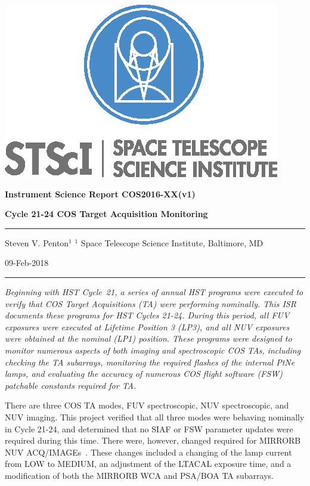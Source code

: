 \documentclass[12pt]{reportj}
\newcommand*{\myfont}{\fontfamily{rm}\selectfont}
\def\acqimages{{\myfont ACQ/IMAGE{\rm s}}\rm~}
\begin{document}
\vspace{-2.4cm}
\noindent\includegraphics*[width=0.295\linewidth]{new_st_logo.eps}

\vspace{-0.4cm}

\begin{flushright}
{\bf Instrument Science Report COS2016-XX(v1)}

\vspace{1.1cm}

{\bf\Huge Cycle 21-24 COS Target Acquisition Monitoring}

\rule{0.25\linewidth}{0.5pt}

\vspace{0.5cm}
Steven V. Penton$^1$
\linebreak
\newline
\footnotesize{$^1$ Space Telescope Science Institute, Baltimore, MD}
\vspace{0.5cm}

09-Feb-2018
\end{flushright}

\vspace{0.1cm}
\noindent\rule{\linewidth}{1.0pt}

{\it \noindent
Beginning with HST Cycle~21, a series of annual HST programs were executed to verify that COS Target Acquisitions (TA) were performing
nominally.  This ISR documents these programs for HST Cycles 21-24. During this period, all FUV exposures were executed at Lifetime Position 3 (LP3),
and all NUV exposures were obtained at the nominal (LP1) position.
These programs were designed to monitor numerous aspects of both imaging and spectroscopic COS TAs, including
checking the TA subarrays, monitoring the required flashes of the internal PtNe lamps, and evaluating the accuracy of
numerous COS flight software (FSW) patchable constants required for TA.

There are three COS TA modes, FUV spectroscopic, NUV spectroscopic, and NUV imaging.
This project verified that all three modes were behaving nominally in Cycle 21-24, and determined that no SIAF or FSW parameter updates were required during this time.
There were, however, changed required for MIRRORB NUV \acqimages. These changes included a changing of the lamp current from LOW to MEDIUM, an adjustment of the LTACAL exposure time, and a modification of both the MIRRORB WCA and PSA/BOA TA subarrays. }
\end{document}
